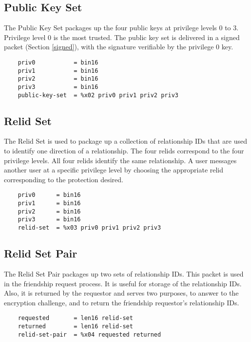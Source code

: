 \documentclass[letterpaper,11pt,oneside]{article}
\begin{document}
\subsection{Public Key Set}
\label{public-key-set}

The Public Key Set packages up the four public keys at privilege levels 0 to 3.
Privilege level 0 is the most trusted. The public key set is delivered in a
signed packet (Section \ref{signed}), with the signature verifiable by the
privilege 0 key.

\vspace{10pt}
\begin{verbatim}
    priv0           = bin16
    priv1           = bin16
    priv2           = bin16
    priv3           = bin16
    public-key-set  = %x02 priv0 priv1 priv2 priv3
\end{verbatim}
\vspace{10pt}

\subsection{Relid Set}

The Relid Set is used to package up a collection of relationship IDs that are
used to identify one direction of a relationship. The four relids correspond to
the four privilege levels. All four relids identify the same relationship. A
user messages another user at a specific privilege level by choosing the
appropriate relid corresponding to the protection desired.

\vspace{10pt}
\begin{verbatim}
    priv0      = bin16
    priv1      = bin16
    priv2      = bin16
    priv3      = bin16
    relid-set  = %x03 priv0 priv1 priv2 priv3
\end{verbatim}
\vspace{10pt}

\subsection{Relid Set Pair}

The Relid Set Pair packages up two sets of relationship IDs. This packet is
used in the friendship request process. It is useful for storage of the
relationship IDs. Also, it is returned by the requestor and serves two
purposes, to answer to the encryption challenge, and to return the friendship
requestor's relationship IDs.

\vspace{10pt}
\begin{verbatim}
    requested       = len16 relid-set
    returned        = len16 relid-set
    relid-set-pair  = %x04 requested returned
\end{verbatim}
\vspace{10pt}
\end{document}
